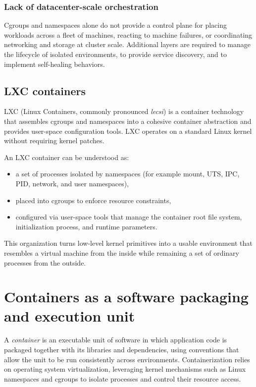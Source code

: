 \documentclass[11pt,a4paper,openany]{report}
\begin{document}
\subsubsection*{Lack of datacenter-scale orchestration}

Cgroups and namespaces alone do not provide a control plane for placing workloads across a fleet of machines, reacting to machine failures, or coordinating networking and storage at cluster scale. Additional layers are required to manage the lifecycle of isolated environments, to provide service discovery, and to implement self-healing behaviors.

\subsection{LXC containers}

LXC (Linux Containers, commonly pronounced \emph{lecsi}) is a container technology that assembles cgroups and namespaces into a cohesive container abstraction and provides user-space configuration tools. LXC operates on a standard Linux kernel without requiring kernel patches.

An LXC container can be understood as:

\begin{itemize}
\item a set of processes isolated by namespaces (for example mount, UTS, IPC, PID, network, and user namespaces),
\item placed into cgroups to enforce resource constraints,
\item configured via user-space tools that manage the container root file system, initialization process, and runtime parameters.
\end{itemize}

This organization turns low-level kernel primitives into a usable environment that resembles a virtual machine from the inside while remaining a set of ordinary processes from the outside.

\section{Containers as a software packaging and execution unit}

A \emph{container} is an executable unit of software in which application code is packaged together with its libraries and dependencies, using conventions that allow the unit to be run consistently across environments. Containerization relies on operating system virtualization, leveraging kernel mechanisms such as Linux namespaces and cgroups to isolate processes and control their resource access.
\end{document}
